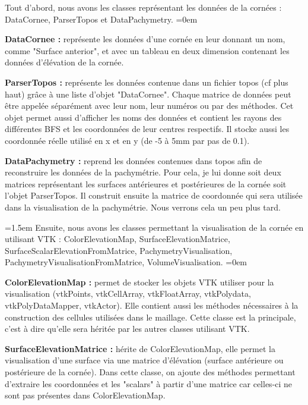 \documentclass[a4paper,12pt]{article}
\begin{document}
\vspace{0.25cm}
Tout d'abord, nous avons les classes représentant les données de la cornées : DataCornee, ParserTopos et DataPachymetry.
\parindent=0em

\textbf{DataCornee : }
représente les données d'une cornée en leur donnant un nom, comme "Surface anterior", et avec un tableau en deux dimension contenant les données d'élévation de la cornée. 

\textbf{ParserTopos : }
représente les données contenue dans un fichier topos (cf plus haut) grâce à une liste d'objet "DataCornee". Chaque matrice de données peut être appelée séparément avec leur nom, leur numéros ou par des méthodes. Cet objet permet aussi d'afficher les noms des données et contient les rayons des différentes BFS et les coordonnées de leur centres respectifs. Il stocke aussi les coordonnée réelle utilisé en x et en y (de -5 à 5mm par pas de 0.1). 

\textbf{DataPachymetry : } 
reprend les données contenues dans topos afin de reconstruire les données de la pachymétrie. Pour cela, je lui donne soit deux matrices représentant les surfaces antérieures et postérieures de la cornée soit l'objet ParserTopos. Il construit ensuite la matrice de coordonnée qui sera utilisée dans la visualisation de la pachymétrie. Nous verrons cela un peu plus tard.

\vspace{0.25cm}
\parindent=1.5em
Ensuite, nous avons les classes permettant la visualisation de la cornée en utilisant VTK : ColorElevationMap, SurfaceElevationMatrice, SurfaceScalarElevationFromMatrice, PachymetryVisualisation, PachymetryVisualisationFromMatrice, VolumeVisualisation.
\parindent=0em

\textbf{ColorElevationMap : }
permet de stocker les objets VTK utiliser pour la visualisation (vtkPoints, vtkCellArray, vtkFloatArray, vtkPolydata, vtkPolyDataMapper, vtkActor). Elle contient aussi les méthodes nécessaires à la construction des cellules utilisées dans le maillage. Cette classe est la principale, c'est à dire qu'elle sera héritée par les autres classes utilisant VTK.

\textbf{SurfaceElevationMatrice : }
hérite de ColorElevationMap, elle permet la visualisation d'une surface via une matrice d'élévation (surface antérieure ou postérieure de la cornée). Dans cette classe, on ajoute des méthodes permettant d'extraire les coordonnées et les "scalars" à partir d'une matrice car celles-ci ne sont pas présentes dans ColorElevationMap.
\end{document}
